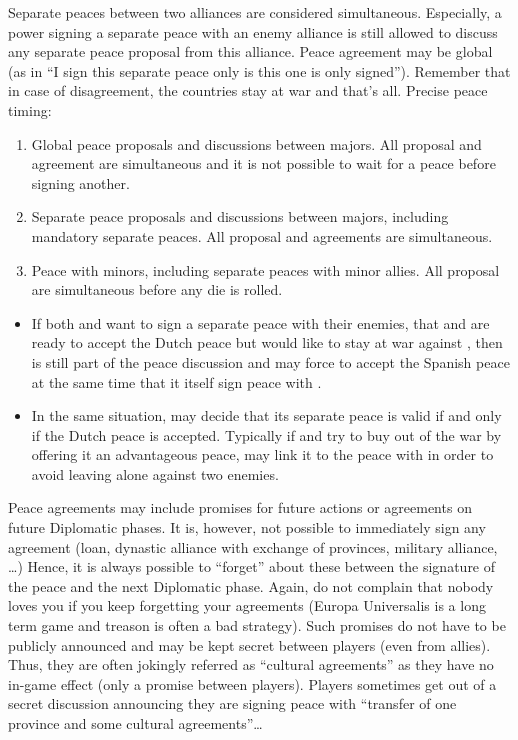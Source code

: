 Separate peaces between two alliances are considered simultaneous. Especially,
a power signing a separate peace with an enemy alliance is still allowed to
discuss any separate peace proposal from this alliance. Peace agreement may be
global (as in ``I sign this separate peace only is this one is only
signed''). Remember that in case of disagreement, the countries stay at war
and that's all.
\bparag Precise peace timing:
\begin{enumerate}
\item Global peace proposals and discussions between majors. All proposal and
  agreement are simultaneous and it is not possible to wait for a peace before
  signing another.
\item Separate peace proposals and discussions between majors, including
  mandatory separate peaces. All proposal and agreements are simultaneous.
\item Peace with minors, including separate peaces with minor allies. All
  proposal are simultaneous before any die is rolled.
\end{enumerate}

\begin{exemple}[Continued]
  \begin{itemize}
  \item If both \HOL and \HIS want to sign a separate peace with their
    enemies, that \FRA and \HIS are ready to accept the Dutch peace but \ANG
    would like to stay at war against \HIS, then \HOL is still part of the
    peace discussion and may force \ANG to accept the Spanish peace at the
    same time that it itself sign peace with \FRA.
  \item In the same situation, \HIS may decide that its separate peace is
    valid if and only if the Dutch peace is accepted. Typically if \ANG and
    \HOL try to buy \HIS out of the war by offering it an advantageous peace,
    \HIS may link it to the peace with \HOL in order to avoid leaving \FRA
    alone against two enemies.
  \end{itemize}
\end{exemple}

\bparag Peace agreements may include promises for future actions or agreements
on future Diplomatic phases.
\bparag It is, however, not possible to immediately sign any agreement (loan,
dynastic alliance with exchange of provinces, military alliance, \ldots)
Hence, it is always possible to ``forget'' about these between the signature
of the peace and the next Diplomatic phase. Again, do not complain that nobody
loves you if you keep forgetting your agreements (Europa Universalis is a long
term game and treason is often a bad strategy).
\bparag Such promises do not have to be publicly announced and may be kept
secret between players (even from allies). Thus, they are often jokingly
referred as ``cultural agreements'' as they have no in-game effect (only a
promise between players). Players sometimes get out of a secret discussion
announcing they are signing peace with ``transfer of one province and some
cultural agreements''\ldots

